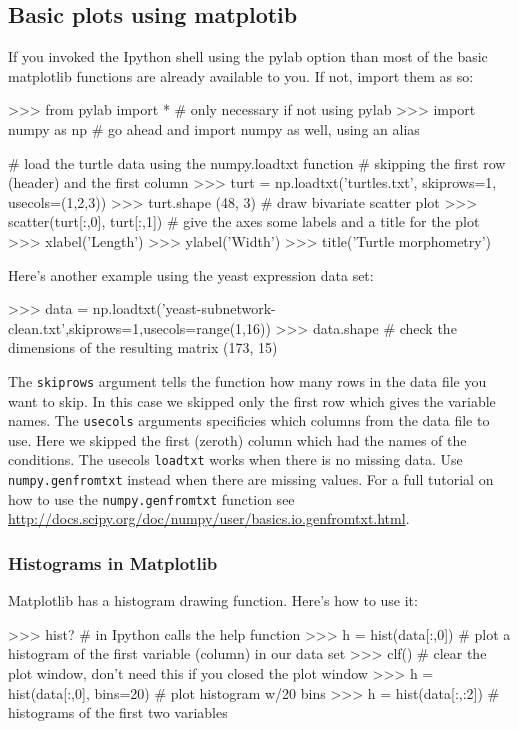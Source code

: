 \subsection{Basic plots using matplotib}

If you invoked the Ipython shell using the pylab option than most of the
basic matplotlib functions are already available to you. If not, import
them as so:

\begin{python}
>>> from pylab import * # only necessary if not using pylab
>>> import numpy as np # go ahead and import numpy as well, using an alias

# load the turtle data using the numpy.loadtxt function 
# skipping the first row (header) and the first column 
>>> turt = np.loadtxt('turtles.txt', skiprows=1, 
                      usecols=(1,2,3))
>>> turt.shape
(48, 3)
# draw bivariate scatter plot
>>> scatter(turt[:,0], turt[:,1])
# give the axes some labels and a title for the plot
>>> xlabel('Length')
>>> ylabel('Width')
>>> title('Turtle morphometry')
\end{python}

Here's another example using the yeast expression data set:
%
\begin{python}
>>> data = np.loadtxt('yeast-subnetwork-clean.txt',skiprows=1,usecols=range(1,16))
>>> data.shape   # check the dimensions of the resulting matrix
(173, 15)
\end{python}
The \lstinline!skiprows! argument tells the function how many rows in
the data file you want to skip. In this case we skipped only the first
row which gives the variable names. The \lstinline!usecols! arguments
specificies which columns from the data file to use. Here we skipped the
first (zeroth) column which had the names of the conditions. The usecols
\lstinline!loadtxt! works when there is no missing data. Use
\lstinline!numpy.genfromtxt! instead when there are missing values. For
a full tutorial on how to use the \lstinline!numpy.genfromtxt! function
see
\url{http://docs.scipy.org/doc/numpy/user/basics.io.genfromtxt.html}.

\subsubsection{Histograms in Matplotlib}

Matplotlib has a histogram drawing function. Here's how to use it:
%
\begin{python}
>>> hist? # in Ipython calls the help function
>>> h = hist(data[:,0]) # plot a histogram of the first variable (column) in our data set
>>> clf() # clear the plot window, don't need this if you closed the plot window
>>> h = hist(data[:,0], bins=20) # plot histogram w/20 bins
>>> h = hist(data[:,:2])  # histograms of the first two variables    
\end{python}

